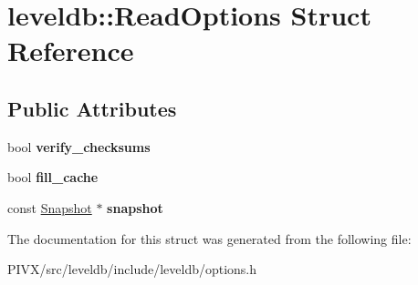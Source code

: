 \hypertarget{structleveldb_1_1_read_options}{}\section{leveldb\+:\+:Read\+Options Struct Reference}
\label{structleveldb_1_1_read_options}
\subsection*{Public Attributes}
\begin{DoxyCompactItemize}
\item 
\mbox{\label{structleveldb_1_1_read_options_a43731d67b707995e20571ad33c1f53f2}} 
bool {\bfseries verify\+\_\+checksums}
\item 
\mbox{\label{structleveldb_1_1_read_options_a49f3754f8838596148ed5cbf9bbf8664}} 
bool {\bfseries fill\+\_\+cache}
\item 
\mbox{\label{structleveldb_1_1_read_options_a1fa3fffc267dff89fce7c39d7c7b5b50}} 
const \mbox{\hyperlink{classleveldb_1_1_snapshot}{Snapshot}} $\ast$ {\bfseries snapshot}
\end{DoxyCompactItemize}


The documentation for this struct was generated from the following file\+:\begin{DoxyCompactItemize}
\item 
P\+I\+V\+X/src/leveldb/include/leveldb/options.\+h\end{DoxyCompactItemize}
